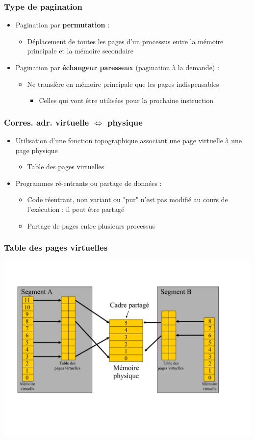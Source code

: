 \begin{frame}
\frametitle{Type de pagination}
\begin{itemize}
\item Pagination par \textbf{permutation} :
\begin{itemize}
\item Déplacement de toutes les pages d'un processus entre la mémoire principale et la mémoire secondaire
\end{itemize}
\item Pagination par \textbf{échangeur paresseux} (pagination à la demande) :
\begin{itemize}
\item Ne transfère en mémoire principale que les pages indispensables
\begin{itemize}
\item Celles qui vont être utilisées pour la prochaine instruction
\end{itemize}
\end{itemize}
\end{itemize}
\end{frame}


\begin{frame}
\frametitle{Corres. adr. virtuelle  $\Leftrightarrow$  physique}
\begin{itemize}
\item Utilisation d'une fonction topographique associant une page virtuelle à une page physique
\begin{itemize}
\item Table des pages virtuelles
\end{itemize}
\item Programmes ré-entrants ou partage de données :
\begin{itemize}
\item Code réentrant, non variant ou "pur" n'est pas modifié au cours de l'exécution : il peut être partagé
\item Partage de pages entre plusieurs processus
\end{itemize}
\end{itemize}
\end{frame}


\begin{frame}
\frametitle{Table des pages virtuelles}
\includegraphics[width=.9\textwidth]{../illustration/table_pages_virtuelles.pdf}
\end{frame}

